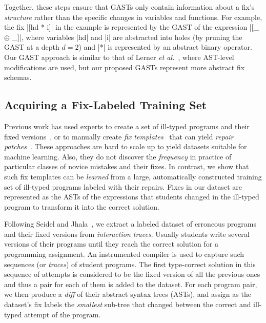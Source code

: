 Together, these steps ensure that GASTs only contain information about a fix's
\emph{structure} rather than the specific changes in variables and functions.
%
For example, the fix |[hd * i]| in the \mbd example is represented by the
GAST of the expression |[_ $\oplus$ _]|, where variables |hd| and |i| are
abstracted into holes (\eg by pruning the GAST at a depth $d=2$) and |*| is
represented by an abstract binary operator. Our GAST approach is similar to
that of Lerner \emph{et al.}~\citep{Lerner2007-dt}, where AST-level modifications are used, but our proposed
GASTs represent more abstract fix schemas.


\subsection{Acquiring a Fix-Labeled Training Set}
\label{sec:overview:data}

Previous work has used experts to create a set of ill-typed programs and their
fixed versions~\citep[][]{Lerner2007-dt, Loncaric2016-uk}, or to manually create
\emph{fix templates}~\cite{kim13par} that can yield \emph{repair
patches}~\citep[][]{martinez2013automatically,martinez2015mining}.
%
These approaches are hard to scale up to yield datasets suitable for machine
learning. Also, they do not discover the \emph{frequency} in practice of particular
classes of novice mistakes and their fixes.
%
In contrast, we show that such fix templates can be \emph{learned} from a large,
automatically constructed training set of ill-typed programs labeled with their
repairs.
%
Fixes in our dataset are represented as the ASTs of the expressions that students
changed in the ill-typed program to transform it into the correct solution.

Following Seidel and Jhala~\citep{Seidel:2017}, we extract a labeled
dataset of erroneous programs
and their fixed versions from \emph{interaction traces}. Usually students write
several versions of their programs until they reach the correct solution for a
programming assignment. An instrumented compiler is used to capture such
sequences (or \emph{traces}) of student programs. The first type-correct
solution in this sequence of attempts is considered to be the fixed
version of all the previous ones and thus a pair for each of them is added to
the dataset. For each program pair, we then produce a \emph{diff} of their
abstract syntax trees (ASTs), and assign as the dataset's fix labels the
\emph{smallest} sub-tree that changed between the correct and ill-typed attempt
of the program.


